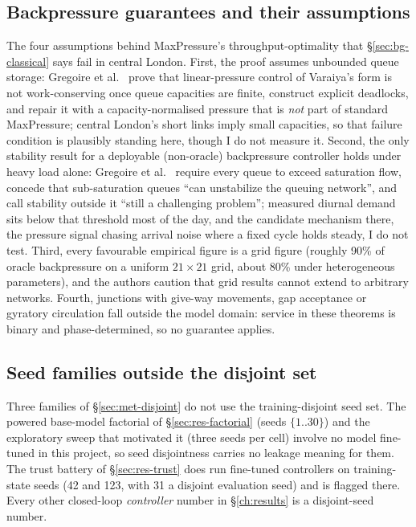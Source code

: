 
\subsection{Backpressure guarantees and their assumptions}\label{app:backpressure}
The four assumptions behind MaxPressure's throughput-optimality
\cite{varaiya2013maxpressure} that \S\ref{sec:bg-classical} says fail in
central London. First, the proof assumes unbounded queue storage: Gregoire
et al.\ \cite{gregoire2014backpressure} prove that linear-pressure control
of Varaiya's form is not work-conserving once queue capacities are finite,
construct explicit deadlocks, and repair it with a capacity-normalised
pressure that is \emph{not} part of standard MaxPressure; central London's
short links imply small capacities, so that failure condition is plausibly
standing here, though I do not measure it. Second, the only stability
result for a deployable (non-oracle) backpressure controller holds under
heavy load alone: Gregoire et al.\ \cite{gregoire2014routing} require
every queue to exceed saturation flow, concede that sub-saturation queues
``can unstabilize the queuing network'', and call stability outside it
``still a challenging problem''; measured diurnal demand sits below that
threshold most of the day, and the candidate mechanism there, the pressure
signal chasing arrival noise where a fixed cycle holds steady, I do not
test. Third, every favourable empirical figure is a grid figure (roughly
90\% of oracle backpressure on a uniform $21\times21$ grid, about 80\%
under heterogeneous parameters), and the authors caution that grid results
cannot extend to arbitrary networks. Fourth, junctions with give-way
movements, gap acceptance or gyratory circulation fall outside the model
domain: service in these theorems is binary and phase-determined, so no
guarantee applies.

\subsection{Seed families outside the disjoint set}\label{app:seedfamilies}
Three families of \S\ref{sec:met-disjoint} do not use the training-disjoint
seed set. The powered base-model factorial of \S\ref{sec:res-factorial}
(seeds $\{1..30\}$) and the exploratory sweep that motivated it (three
seeds per cell) involve no model fine-tuned in this project, so seed
disjointness carries no leakage meaning for them. The trust battery of
\S\ref{sec:res-trust} does run fine-tuned controllers on training-state
seeds (42 and 123, with 31 a disjoint evaluation seed) and is flagged
there. Every other closed-loop \emph{controller} number in
\S\ref{ch:results} is a disjoint-seed number.

